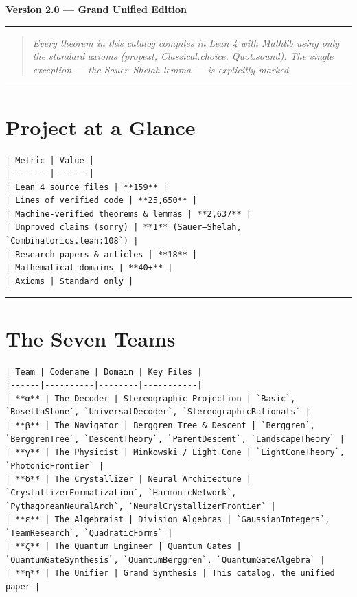 \documentclass[12pt,a4paper,openany]{book}
\begin{document}
\textbf{Version 2.0 — Grand Unified Edition}

\bigskip\hrule\bigskip

\begin{quote}\textit{\textit{Every theorem in this catalog compiles in Lean 4 with Mathlib using only the standard axioms (propext, Classical.choice, Quot.sound). The single exception — the Sauer–Shelah lemma — is explicitly marked.}}\end{quote}

\bigskip\hrule\bigskip

\section{Project at a Glance}

\begin{verbatim}
| Metric | Value |
|--------|-------|
| Lean 4 source files | **159** |
| Lines of verified code | **25,650** |
| Machine-verified theorems & lemmas | **2,637** |
| Unproved claims (sorry) | **1** (Sauer–Shelah, `Combinatorics.lean:108`) |
| Research papers & articles | **18** |
| Mathematical domains | **40+** |
| Axioms | Standard only |
\end{verbatim}

\bigskip\hrule\bigskip

\section{The Seven Teams}

\begin{verbatim}
| Team | Codename | Domain | Key Files |
|------|----------|--------|-----------|
| **α** | The Decoder | Stereographic Projection | `Basic`, `RosettaStone`, `UniversalDecoder`, `StereographicRationals` |
| **β** | The Navigator | Berggren Tree & Descent | `Berggren`, `BerggrenTree`, `DescentTheory`, `ParentDescent`, `LandscapeTheory` |
| **γ** | The Physicist | Minkowski / Light Cone | `LightConeTheory`, `PhotonicFrontier` |
| **δ** | The Crystallizer | Neural Architecture | `CrystallizerFormalization`, `HarmonicNetwork`, `PythagoreanNeuralArch`, `NeuralCrystallizerFrontier` |
| **ε** | The Algebraist | Division Algebras | `GaussianIntegers`, `TeamResearch`, `QuadraticForms` |
| **ζ** | The Quantum Engineer | Quantum Gates | `QuantumGateSynthesis`, `QuantumBerggren`, `QuantumGateAlgebra` |
| **η** | The Unifier | Grand Synthesis | This catalog, the unified paper |
\end{verbatim}
\end{document}
